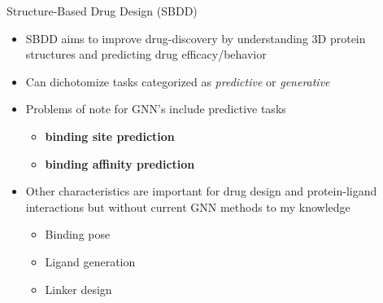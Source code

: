 \documentclass{beamer}
\begin{document}
\begin{frame}{Structure-Based Drug Design (SBDD)}
    \begin{itemize}
        \item SBDD aims to improve drug-discovery by understanding 3D protein structures and predicting drug efficacy/behavior %
        \item Can dichotomize tasks categorized as \textit{predictive} or \textit{generative}
        \item Problems of note for GNN's include predictive tasks 
        \begin{itemize}
            \item \textbf{binding site prediction} 
            \item \textbf{binding affinity prediction}
        \end{itemize}
        \item Other characteristics are important for drug design and protein-ligand interactions but without current GNN methods to my knowledge 
        \begin{itemize}
            \item Binding pose 
            \item Ligand generation 
            \item Linker design 
        \end{itemize}
    \end{itemize}
\end{frame}
\end{document}

